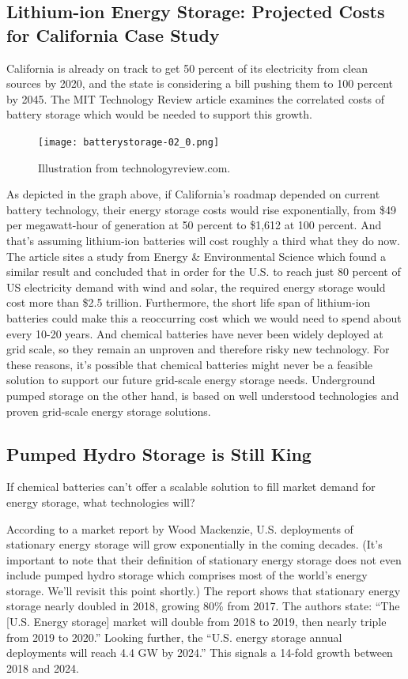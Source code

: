 \documentclass[hidelinks,12pt,a4paper]{article}
\begin{document}
\subsection{Lithium-ion Energy Storage: Projected Costs for California Case Study}

California is already on track to get 50 percent of its electricity from clean sources by 2020, and the state is considering a bill pushing them to 100 percent by 2045. The MIT Technology Review article examines the correlated costs of battery storage which would be needed to support this growth.

\begin{figure}[ht!]
    \centering
    \texttt{[image: batterystorage-02\_0.png]}
    \caption{Illustration from technologyreview.com. \cite{TheTwoPointFiveTrillionReasonWeCantRelyOnBatteries}}
\end{figure}
\FloatBarrier

As depicted in the graph above, if California's roadmap depended on current battery technology, their energy storage costs would rise exponentially, from \$49 per megawatt-hour of generation at 50 percent to \$1,612 at 100 percent. And that's assuming lithium-ion batteries will cost roughly a third what they do now. The article sites a study from Energy \& Environmental Science which found a similar result and concluded that in order for the U.S. to reach just 80 percent of US electricity demand with wind and solar, the required energy storage would cost more than \$2.5 trillion. \cite{TheTwoPointFiveTrillionReasonWeCantRelyOnBatteries} Furthermore, the short life span of lithium-ion batteries could make this a reoccurring cost which we would need to spend about every 10-20 years. And chemical batteries have never been widely deployed at grid scale, so they remain an unproven and therefore risky new technology. For these reasons, it's possible that chemical batteries might never be a feasible solution to support our future grid-scale energy storage needs. Underground pumped storage on the other hand, is based on well understood technologies and proven grid-scale energy storage solutions.

\subsection{Pumped Hydro Storage is Still King}
If chemical batteries can't offer a scalable solution to fill market demand for energy storage, what technologies will?

According to a market report by Wood Mackenzie, U.S. deployments of stationary energy storage will grow exponentially in the coming decades. (It's important to note that their definition of stationary energy storage does not even include pumped hydro storage which comprises most of the world's energy storage. We'll revisit this point shortly.) The report shows that stationary energy storage nearly doubled in 2018, growing 80\% from 2017. \cite{USEnergyStorageMonitor2018YIRAndQ12019} The authors state: “The [U.S. Energy storage] market will double from 2018 to 2019, then nearly triple from 2019 to 2020.” Looking further, the “U.S. energy storage annual deployments will reach 4.4 GW by 2024.” This signals a 14-fold growth between 2018 and 2024.
\end{document}

